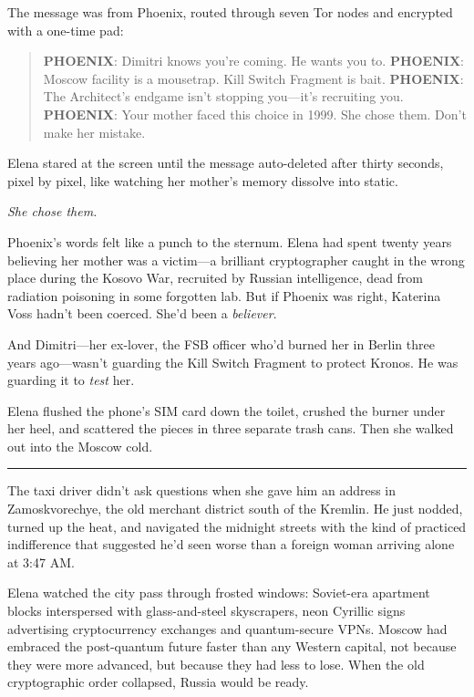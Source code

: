 The message was from Phoenix, routed through seven Tor nodes and encrypted with a one-time pad:

\begin{quote}
\textbf{PHOENIX}: Dimitri knows you're coming. He wants you to. \textbf{PHOENIX}: Moscow facility is a mousetrap. Kill Switch Fragment is bait. \textbf{PHOENIX}: The Architect's endgame isn't stopping you---it's recruiting you. \textbf{PHOENIX}: Your mother faced this choice in 1999. She chose them. Don't make her mistake.
\end{quote}

Elena stared at the screen until the message auto-deleted after thirty seconds, pixel by pixel, like watching her mother's memory dissolve into static.

\emph{She chose them.}

Phoenix's words felt like a punch to the sternum. Elena had spent twenty years believing her mother was a victim---a brilliant cryptographer caught in the wrong place during the Kosovo War, recruited by Russian intelligence, dead from radiation poisoning in some forgotten lab. But if Phoenix was right, Katerina Voss hadn't been coerced. She'd been a \emph{believer}.

And Dimitri---her ex-lover, the FSB officer who'd burned her in Berlin three years ago---wasn't guarding the Kill Switch Fragment to protect Kronos. He was guarding it to \emph{test} her.

Elena flushed the phone's SIM card down the toilet, crushed the burner under her heel, and scattered the pieces in three separate trash cans. Then she walked out into the Moscow cold.

\begin{center}\rule{0.5\linewidth}{0.5pt}\end{center}

The taxi driver didn't ask questions when she gave him an address in Zamoskvorechye, the old merchant district south of the Kremlin. He just nodded, turned up the heat, and navigated the midnight streets with the kind of practiced indifference that suggested he'd seen worse than a foreign woman arriving alone at 3:47 AM.

Elena watched the city pass through frosted windows: Soviet-era apartment blocks interspersed with glass-and-steel skyscrapers, neon Cyrillic signs advertising cryptocurrency exchanges and quantum-secure VPNs. Moscow had embraced the post-quantum future faster than any Western capital, not because they were more advanced, but because they had less to lose. When the old cryptographic order collapsed, Russia would be ready.

